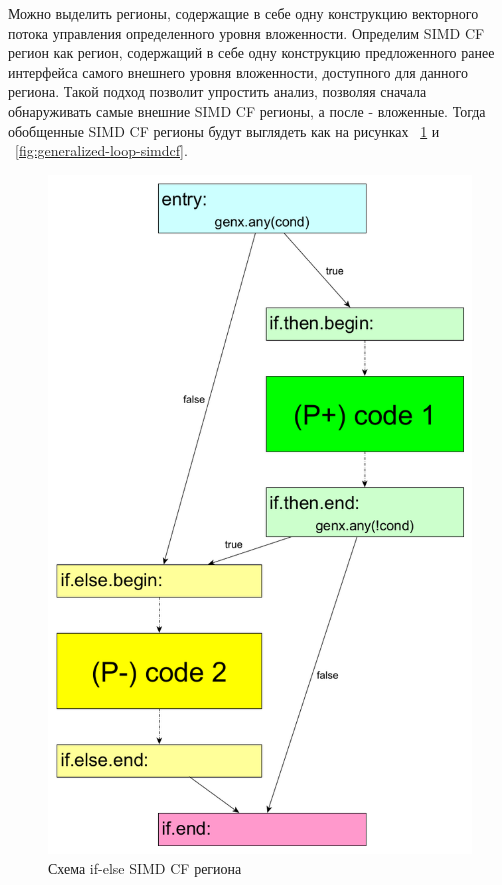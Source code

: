 Можно выделить регионы, содержащие в себе одну конструкцию векторного потока
управления определенного уровня вложенности. Определим SIMD CF регион как
регион, содержащий в себе одну конструкцию предложенного ранее интерфейса самого
внешнего уровня вложенности, доступного для данного региона. Такой подход
позволит упростить анализ, позволяя сначала обнаруживать самые внешние SIMD CF
регионы, а после - вложенные. Тогда обобщенные SIMD CF регионы будут выглядеть
как на рисунках ~\ref{fig:generalized-if-simdcf} и ~\ref{fig:generalized-loop-simdcf}.
\begin{figure}
  \centering
  \includegraphics[scale=0.27]{Images/if-else-FE-generalized-colored.png}
  \caption{Схема if-else SIMD CF региона}
  \label{fig:generalized-if-simdcf}
\end{figure}
